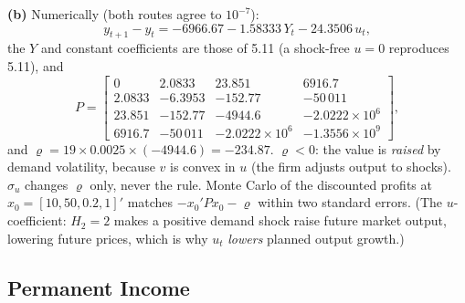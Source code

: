 \documentclass[12pt, letterpaper]{article}
\begin{document}
\begin{tcolorbox}[evenbox,title={Exercise 5.12 \quad Adjustment costs with a demand shock}]
\textbf{(b)} Numerically (both routes agree to $10^{-7}$):
\[
y_{t+1}-y_t=-6966.67-1.58333\,Y_t-24.3506\,u_t,
\]
the $Y$ and constant coefficients are those of 5.11 (a shock-free $u=0$ reproduces 5.11), and
\[
P=\begin{bmatrix}0&2.0833&23.851&6916.7\\2.0833&-6.3953&-152.77&-50\,011\\
23.851&-152.77&-4944.6&-2.0222\times10^6\\6916.7&-50\,011&-2.0222\times10^6&-1.3556\times10^9\end{bmatrix},
\]
and $\varrho=19\times0.0025\times(-4944.6)=-234.87$.
$\varrho<0$: the value is \emph{raised} by demand volatility, because $v$ is convex in $u$ (the firm
adjusts output to shocks). $\sigma_u$ changes $\varrho$ only, never the rule. Monte Carlo of the
discounted profits at $x_0=[10,50,0.2,1]'$ matches $-x_0'Px_0-\varrho$ within two standard errors.
(The $u$-coefficient: $H_2=2$ makes a positive demand shock raise future market output, lowering
future prices, which is why $u_t$ \emph{lowers} planned output growth.)
\end{tcolorbox}

\subsection{Permanent Income}
\end{document}
